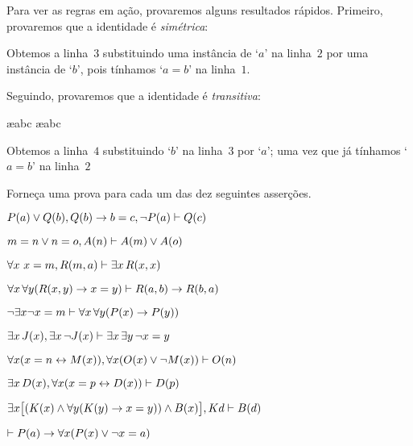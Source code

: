 Para ver as regras em a\c c\~ao, provaremos alguns resultados r\'apidos. Primeiro, provaremos que a identidade \'e  \emph{sim\'etrica}:
 
\begin{fitchproof}
	\open
	\close
\end{fitchproof}
Obtemos a linha~$3$ substituindo uma inst\^ancia de `$a$'  na linha~$2$ por uma inst\^ancia de `$b$', pois t\'inhamos `$a= b$' na linha~$1$.

Seguindo, provaremos que a identidade \'e  \emph{transitiva}:
\begin{fitchproof}
	\open
		\ae{abc}
		\ae{abc}
	\close
\end{fitchproof}
Obtemos a linha~$4$ substituindo `$b$'  na linha~$3$ por `$a$'; uma vez que j\'a t\'inhamos  `$a= b$' na  linha~$2$

\practiceproblems
\problempart
\label{pr.identity}
Forne\c ca uma prova para cada um das dez seguintes asser\c c\~oes.
   
\begin{earg}
\item $\mathord{P}(a) \vee \mathord{Q}(b), \mathord{Q}(b) \rightarrow b=c, \neg\mathord{P}(a) \vdash \mathord{Q}(c)$
\item $m=n \vee n=o, \mathord{A}(n) \vdash \mathord{A}(m) \vee \mathord{A}(o)$
\item $\forall x\ x=m, \mathord{R}(m,a) \vdash \exists x\,\mathord{R}(x,x)$
\item $\forall x\,\forall y(\mathord{R}(x,y) \rightarrow x=y)\vdash \mathord{R}(a,b) \rightarrow \mathord{R}(b,a)$
\item $\neg \exists x\neg x = m \vdash \forall x\,\forall y (\mathord{P}(x) \rightarrow \mathord{P}(y))$
\item $\exists x\,\mathord{J}(x), \exists x\, \neg\mathord{J}(x)\vdash \exists x\, \exists y\, \neg x = y$
\item $\forall x(x=n \leftrightarrow \mathord{M}(x)), \forall x(\mathord{O}(x) \vee \neg \mathord{M}(x))\vdash \mathord{O}(n)$
\item $\exists x\,\mathord{D}(x), \forall x(x=p \leftrightarrow \mathord{D}(x))\vdash \mathord{D}(p)$
\item $\exists x\bigl[(\mathord{K}(x) \wedge \forall y(\mathord{K}(y) \rightarrow x=y)) \wedge \mathord{B}(x)\bigr], Kd\vdash \mathord{B}(d)$
\item $\vdash \mathord{P}(a) \rightarrow \forall x(\mathord{P}(x) \vee \neg x = a)$
\end{earg}

